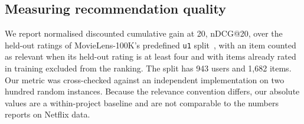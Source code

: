 \subsection{Measuring recommendation quality}
\label{sec:background:ndcg}

We report normalised discounted cumulative gain at 20, nDCG@20, over the held-out
ratings of MovieLens-100K's predefined \texttt{u1} split~\cite{movielens2016},
with an item counted as relevant when its held-out rating is at least four and
with items already rated in training excluded from the ranking. The split has 943
users and 1{,}682 items. Our metric was cross-checked against an independent
implementation on two hundred random instances. Because the relevance convention
differs, our absolute values are a within-project baseline and are not comparable
to the numbers \nudgeplain{} reports on Netflix data.
